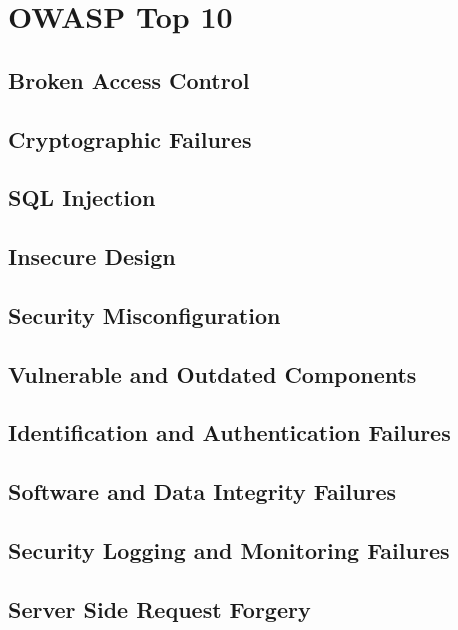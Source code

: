 \documentclass[a4paper, 11pt]{book}
\begin{document}
    \section{OWASP Top 10}

    \subsection{Broken Access Control}

    \subsection{Cryptographic Failures}

    \subsection{SQL Injection}

    \subsection{Insecure Design}

    \subsection{Security Misconfiguration}

    \subsection{Vulnerable and Outdated Components}

    \subsection{Identification and Authentication Failures}

    \subsection{Software and Data Integrity Failures}

    \subsection{Security Logging and Monitoring Failures}

    \subsection{Server Side Request Forgery}
\end{document}
